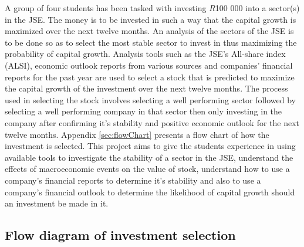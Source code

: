 \documentclass[letterpaper, 10 pt, conference]{ieeeconf}  %
\begin{document}
A group of four students has been tasked with investing $R$100 000 into a sector(s) in the JSE. The money is to be invested in such a way that the capital growth is maximized over the next twelve months. An analysis of the sectors of the JSE is to be done so as to select the most stable sector to invest in thus maximizing the probability of capital growth. Analysis tools such as the JSE's All-share index (ALSI), economic outlook reports from various sources and companies' financial reports for the past year are used to select a stock that is predicted to maximize the capital growth of the investment over the next twelve months. The process used in selecting the stock involves selecting a well performing sector followed by selecting a well performing company in that sector then only investing in the company after confirming it's stability and positive economic outlook for the next twelve months. Appendix \ref{sec:flowChart} presents a flow chart of how the investment is selected. This project aims to give the students experience in using available tools to investigate the stability of a sector in the JSE, understand the effects of macroeconomic events on the value of stock, understand how to use a company's financial reports to determine it's stability and also to use a company's financial outlook to determine the likelihood of capital growth should an investment be made in it. 

\cleardoublepage
\appendix

\subsection{Flow diagram of investment selection}
\end{document}
